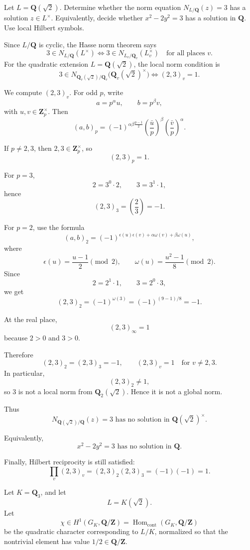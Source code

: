 {\prob Let \(L=\mathbf Q(\sqrt 2)\). Determine whether the norm equation
$N_{L/\mathbf Q}(z)=3$
has a solution \(z\in L^\times\). Equivalently, decide whether
$x^2-2y^2=3$
has a solution in \(\mathbf Q\). Use local Hilbert symbols.

Since \(L/\mathbf Q\) is cyclic, the Hasse norm theorem says
\[
3\in N_{L/\mathbf Q}(L^\times)
\iff
3\in N_{L_v/\mathbf Q_v}(L_v^\times)
\quad\text{for all places }v.
\]
For the quadratic extension \(L=\mathbf Q(\sqrt2)\), the local norm condition is
\[
3\in N_{\mathbf Q_v(\sqrt2)/\mathbf Q_v}
\bigl(\mathbf Q_v(\sqrt2)^\times\bigr)
\iff
(2,3)_v=1.
\]

We compute \((2,3)_v\). For odd \(p\), write
\[
a=p^\alpha u,\qquad b=p^\beta v,
\]
with \(u,v\in\mathbf Z_p^\times\). Then
\[
(a,b)_p
=
(-1)^{\alpha\beta\frac{p-1}{2}}
\left(\frac{\bar u}{p}\right)^\beta
\left(\frac{\bar v}{p}\right)^\alpha.
\]

If \(p\neq 2,3\), then \(2,3\in\mathbf Z_p^\times\), so
\[
(2,3)_p=1.
\]

For \(p=3\),
\[
2=3^0\cdot 2,\qquad 3=3^1\cdot 1,
\]
hence
\[
(2,3)_3=\left(\frac{2}{3}\right)=-1.
\]

For \(p=2\), use the formula
\[
(a,b)_2
=
(-1)^{
\epsilon(u)\epsilon(v)
+\alpha\omega(v)
+\beta\omega(u)
},
\]
where
\[
\epsilon(u)=\frac{u-1}{2}\pmod 2,
\qquad
\omega(u)=\frac{u^2-1}{8}\pmod 2.
\]
Since
\[
2=2^1\cdot 1,\qquad 3=2^0\cdot 3,
\]
we get
\[
(2,3)_2
=
(-1)^{\omega(3)}
=
(-1)^{(9-1)/8}
=
-1.
\]

At the real place,
\[
(2,3)_\infty=1
\]
because \(2>0\) and \(3>0\).

Therefore
\[
(2,3)_2=(2,3)_3=-1,
\qquad
(2,3)_v=1\quad\text{for }v\neq 2,3.
\]
In particular,
\[
(2,3)_2\neq 1,
\]
so \(3\) is not a local norm from \(\mathbf Q_2(\sqrt2)\). Hence it is not a global norm.

Thus
\[
\boxed{
N_{\mathbf Q(\sqrt2)/\mathbf Q}(z)=3
\text{ has no solution in } \mathbf Q(\sqrt2)^\times.
}
\]

Equivalently,
\[
\boxed{
x^2-2y^2=3
\text{ has no solution in } \mathbf Q.
}
\]

Finally, Hilbert reciprocity is still satisfied:
\[
\prod_v(2,3)_v
=
(2,3)_2(2,3)_3
=
(-1)(-1)=1.
\]


\np Let \(K=\mathbf Q_3\), and let
\[
L=K(\sqrt 2).
\]
Let
\[
\chi\in H^1(G_K,\mathbf Q/\mathbf Z)
=
\operatorname{Hom}_{\mathrm{cont}}(G_K,\mathbf Q/\mathbf Z)
\]
be the quadratic character corresponding to \(L/K\), normalized so that the
nontrivial element has value \(1/2\in \mathbf Q/\mathbf Z\).

}
